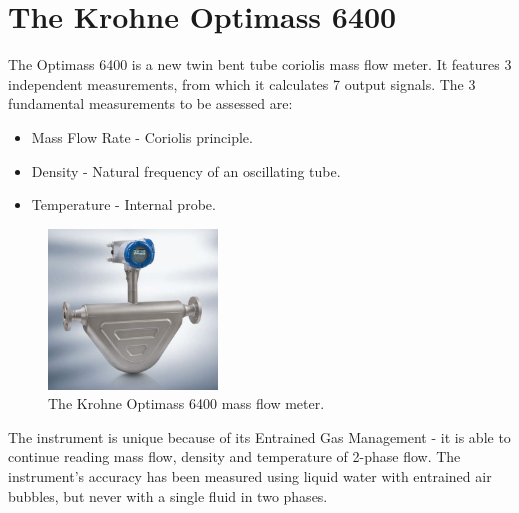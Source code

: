 \documentclass{report}
\begin{document}
\section{The Krohne Optimass 6400}
The Optimass 6400 is a new twin bent tube coriolis mass flow meter. It features 3 independent measurements, from which it calculates 7 output signals. The 3 fundamental measurements to be assessed are:
\begin{itemize}
\item{Mass Flow Rate - Coriolis principle.}
\item{Density - Natural frequency of an oscillating tube.}
\item{Temperature - Internal probe.}
\end{itemize}
\begin{figure}
\includegraphics[width=0.4\textwidth]{Optimass6400}
\caption{The Krohne Optimass 6400 mass flow meter.} %
\label{fig:optimass6400}
\end{figure}
The instrument is unique because of its Entrained Gas Management - it is able to continue reading mass flow, density and temperature of 2-phase flow. The instrument's accuracy has been measured using liquid water with entrained air bubbles, but never with a single fluid in two phases. 
\end{document}
